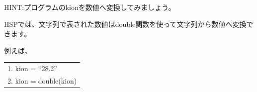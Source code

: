 \documentclass[text08.tex]{subfiles}
\begin{document}

\begin{tcolorbox}[title=\useOmetoi,breakable]\label{Q:amedas2}
  \begin{enumerate}
    HINT:プログラムのkionを数値へ変換してみましょう。

    HSPでは、文字列で表された数値はdouble関数を使って文字列から数値へ変換できます。

    例えば、
    \begin{center}
      \begin{tabular}{|l|}
        \hline
        1. kion = “28.2”\\
        2. kion = double(kion)\\
        \hline
      \end{tabular}
    \end{center}
  \end{enumerate}
\end{tcolorbox}


\end{document}
